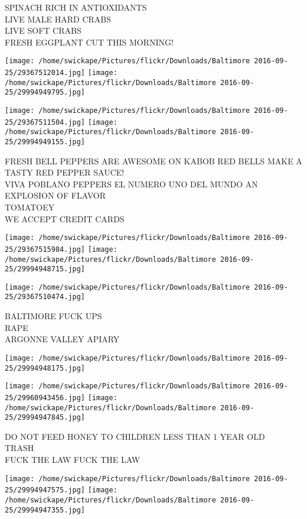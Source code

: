 \documentclass[10pt,letterpaper]{article}
\begin{document}
SPINACH RICH IN ANTIOXIDANTS\\
LIVE MALE HARD CRABS\\
LIVE SOFT CRABS\\
FRESH EGGPLANT CUT THIS MORNING!
\pagebreak

\texttt{[image: /home/swickape/Pictures/flickr/Downloads/Baltimore 2016-09-25/29367512014.jpg]}
\texttt{[image: /home/swickape/Pictures/flickr/Downloads/Baltimore 2016-09-25/29994949795.jpg]}

\texttt{[image: /home/swickape/Pictures/flickr/Downloads/Baltimore 2016-09-25/29367511504.jpg]}
\texttt{[image: /home/swickape/Pictures/flickr/Downloads/Baltimore 2016-09-25/29994949155.jpg]}

FRESH BELL PEPPERS ARE AWESOME ON KABOB RED BELLS MAKE A TASTY RED PEPPER SAUCE!\\
VIVA POBLANO PEPPERS EL NUMERO UNO DEL MUNDO AN EXPLOSION OF FLAVOR\\
TOMATOEY\\
WE ACCEPT CREDIT CARDS
\pagebreak

\texttt{[image: /home/swickape/Pictures/flickr/Downloads/Baltimore 2016-09-25/29367515984.jpg]}
\texttt{[image: /home/swickape/Pictures/flickr/Downloads/Baltimore 2016-09-25/29994948715.jpg]}

\texttt{[image: /home/swickape/Pictures/flickr/Downloads/Baltimore 2016-09-25/29367510474.jpg]}

BALTIMORE FUCK UPS\\
RAPE\\
ARGONNE VALLEY APIARY
\pagebreak

\texttt{[image: /home/swickape/Pictures/flickr/Downloads/Baltimore 2016-09-25/29994948175.jpg]}

\vspace{0.25in}
\texttt{[image: /home/swickape/Pictures/flickr/Downloads/Baltimore 2016-09-25/29960943456.jpg]}
\texttt{[image: /home/swickape/Pictures/flickr/Downloads/Baltimore 2016-09-25/29994947845.jpg]}

DO NOT FEED HONEY TO CHILDREN LESS THAN 1 YEAR OLD\\
TRASH\\
FUCK THE LAW FUCK THE LAW
\pagebreak

\texttt{[image: /home/swickape/Pictures/flickr/Downloads/Baltimore 2016-09-25/29994947575.jpg]}
\texttt{[image: /home/swickape/Pictures/flickr/Downloads/Baltimore 2016-09-25/29994947355.jpg]}
\end{document}

